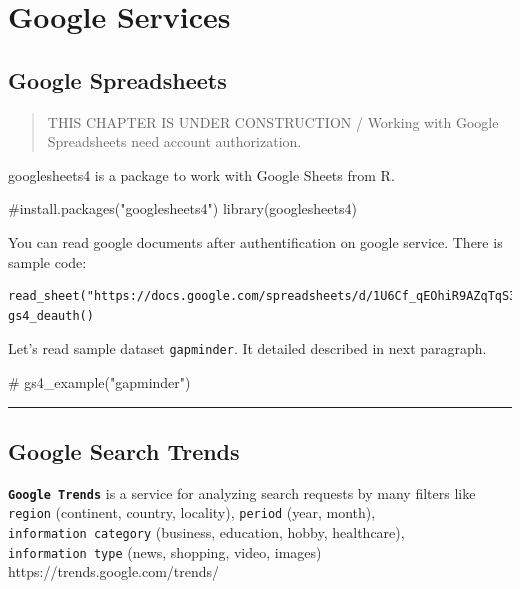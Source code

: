 \documentclass[
  letterpaper,
  DIV=11,
  numbers=noendperiod]{scrreprt}
\newenvironment{Shaded}{\begin{snugshade}}{\end{snugshade}}
\newcommand{\CommentTok}[1]{\textcolor[rgb]{0.37,0.37,0.37}{#1}}
\newcommand{\FunctionTok}[1]{\textcolor[rgb]{0.28,0.35,0.67}{#1}}
\newcommand{\NormalTok}[1]{\textcolor[rgb]{0.00,0.23,0.31}{#1}}
\begin{document}
\chapter{Google Services}\label{google-services}

\section{Google Spreadsheets}\label{google-spreadsheets}

\begin{quote}
THIS CHAPTER IS UNDER CONSTRUCTION / Working with Google Spreadsheets
need account authorization.
\end{quote}

googlesheets4 is a package to work with Google Sheets from R.

\begin{Shaded}
\begin{Highlighting}[]
\CommentTok{\#install.packages("googlesheets4")}
\FunctionTok{library}\NormalTok{(googlesheets4)}
\end{Highlighting}
\end{Shaded}

You can read google documents after authentification on google service.
There is sample code:

\begin{verbatim}
read_sheet("https://docs.google.com/spreadsheets/d/1U6Cf_qEOhiR9AZqTqS3mbMF3zt2db48ZP5v3rkrAEJY/edit#gid=780868077")
gs4_deauth()
\end{verbatim}

Let's read sample dataset \texttt{gapminder}. It detailed described in
next paragraph.

\begin{Shaded}
\begin{Highlighting}[]
\CommentTok{\# gs4\_example("gapminder")}
\end{Highlighting}
\end{Shaded}

\begin{center}\rule{0.5\linewidth}{0.5pt}\end{center}

\section{Google Search Trends}\label{google-search-trends}

\textbf{\texttt{Google\ Trends}} is a service for analyzing search
requests by many filters like \texttt{region} (continent, country,
locality), \texttt{period} (year, month), \texttt{information\ category}
(business, education, hobby, healthcare), \texttt{information\ type}
(news, shopping, video, images) https://trends.google.com/trends/
\end{document}
